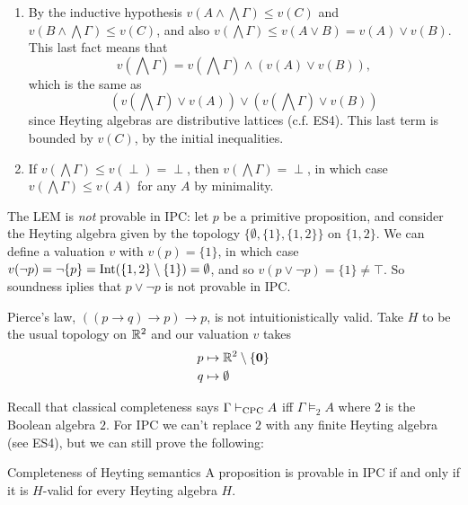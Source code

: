 \documentclass{article}
\numberwithin{thm}{subsection}
\begin{document}
\begin{enumerate}
    \item[($\vee$-E)] By the inductive hypothesis $v\left(A \wedge \bigwedge \Gamma \right) \leq v(C)$ and $v\left( B \wedge \bigwedge \Gamma \right) \leq v(C)$, and also $v(\bigwedge \Gamma) \leq v(A \vee B) = v(A) \vee v(B)$. This last fact means that \[ v\left( \bigwedge \Gamma \right) = v\left(\bigwedge \Gamma \right) \wedge \left( v(A) \vee v(B) \right),\]
    which is the same as \[\left( v\left( \bigwedge \Gamma \right) \vee v(A) \right) \vee \left( v\left( \bigwedge \Gamma \right) \vee v(B) \right)\] since Heyting algebras are distributive lattices (c.f. ES4). This last term is bounded by $v(C)$, by the initial inequalities.
    \item[($\perp$-E)] If $v\left( \bigwedge \Gamma \right) \leq v(\perp) = \perp$, then $v\left( \bigwedge \Gamma \right) = \perp$, in which case $v\left( \bigwedge \Gamma \right) \leq v(A)$ for any $A$ by minimality.
\end{enumerate}
\endproof 
\begin{ex}
    The LEM is \textit{not} provable in IPC: let $p$ be a primitive proposition, and consider the Heyting algebra given by the topology $\{ \emptyset, \{1\}, \{1,2\}\}$ on $\{1,2\}$. We can define a valuation $v$ with $v(p) = \{1\}$, in which case $v(\neg p) = \neg \{ p\} = \operatorname{Int}(\{1,2\}\setminus \{1\}) = \emptyset$, and so $v(p \vee \neg p) = \{ 1\} \neq \top$. \gap So soundness iplies that $p \vee \neg p$ is not provable in IPC.
\end{ex}
\begin{ex}
    Pierce's law, $\left(\left( p \to q \right) \to p \right) \to p$, is not intuitionistically valid. Take $H$ to be the usual topology on $\mathbb{R}^{2}$ and our valuation $v$ takes \begin{align*} p &\mapsto \mathbb{R}^{2} \setminus \{\mathbf{0}\} \\ q &\mapsto \emptyset \end{align*}
\end{ex}
Recall that classical completeness says $\Gamma \vdash_{\text{CPC}} A$ iff $\Gamma \models_{2} A$ where $2$ is the Boolean algebra $2$. For IPC we can't replace $2$ with any finite Heyting algebra (see ES4), but we can still prove the following: \begin{fancythm}{Completeness of Heyting semantics}
    A proposition is provable in IPC if and only if it is $H$-valid for every Heyting algebra $H$.
\end{fancythm}
\end{document}
